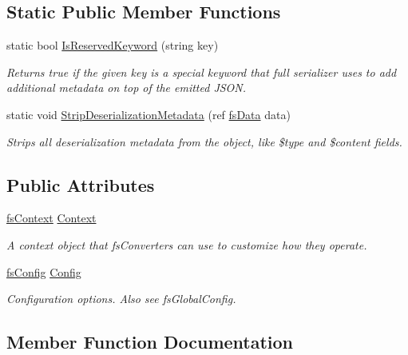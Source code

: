 \subsection*{Static Public Member Functions}
\begin{DoxyCompactItemize}
\item 
static bool \hyperlink{class_full_serializer_1_1fs_serializer_a720cc782d2299ee7a1050905d224a12c}{Is\+Reserved\+Keyword} (string key)
\begin{DoxyCompactList}\small\item\em Returns true if the given key is a special keyword that full serializer uses to add additional metadata on top of the emitted J\+S\+ON. \end{DoxyCompactList}\item 
static void \hyperlink{class_full_serializer_1_1fs_serializer_a9adc1e64a01745e7cad713f39dc27630}{Strip\+Deserialization\+Metadata} (ref \hyperlink{class_full_serializer_1_1fs_data}{fs\+Data} data)
\begin{DoxyCompactList}\small\item\em Strips all deserialization metadata from the object, like \$type and \$content fields. \end{DoxyCompactList}\end{DoxyCompactItemize}
\subsection*{Public Attributes}
\begin{DoxyCompactItemize}
\item 
\hyperlink{class_full_serializer_1_1fs_context}{fs\+Context} \hyperlink{class_full_serializer_1_1fs_serializer_a19a1520594532d7d8bcbcf4f1dac557f}{Context}
\begin{DoxyCompactList}\small\item\em A context object that fs\+Converters can use to customize how they operate. \end{DoxyCompactList}\item 
\hyperlink{class_full_serializer_1_1fs_config}{fs\+Config} \hyperlink{class_full_serializer_1_1fs_serializer_a2cf05f098caf0bf67427114d20abb0ca}{Config}
\begin{DoxyCompactList}\small\item\em Configuration options. Also see fs\+Global\+Config. \end{DoxyCompactList}\end{DoxyCompactItemize}


\subsection{Member Function Documentation}
\mbox{\label{class_full_serializer_1_1fs_serializer_aa9f27b67927f4e097ba578dd4d0145d2}} 
